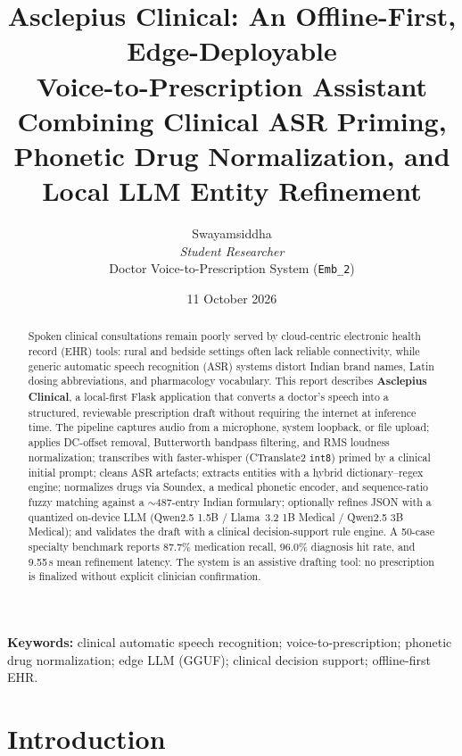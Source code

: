 \documentclass[11pt,a4paper]{article}
\title{\textbf{Asclepius Clinical: An Offline-First, Edge-Deployable\\
Voice-to-Prescription Assistant Combining Clinical ASR Priming,\\
Phonetic Drug Normalization, and Local LLM Entity Refinement}}
\author{Swayamsiddha\\
\textit{Student Researcher}\\
Doctor Voice-to-Prescription System (\texttt{Emb\_2})}
\date{11 October 2026}
\begin{document}
\maketitle

\begin{abstract}
Spoken clinical consultations remain poorly served by cloud-centric electronic health record (EHR) tools: rural and bedside settings often lack reliable connectivity, while generic automatic speech recognition (ASR) systems distort Indian brand names, Latin dosing abbreviations, and pharmacology vocabulary. This report describes \textbf{Asclepius Clinical}, a local-first Flask application that converts a doctor's speech into a structured, reviewable prescription draft without requiring the internet at inference time. The pipeline captures audio from a microphone, system loopback, or file upload; applies DC-offset removal, Butterworth bandpass filtering, and RMS loudness normalization; transcribes with faster-whisper (CTranslate2 \texttt{int8}) primed by a clinical initial prompt; cleans ASR artefacts; extracts entities with a hybrid dictionary--regex engine; normalizes drugs via Soundex, a medical phonetic encoder, and sequence-ratio fuzzy matching against a $\sim$487-entry Indian formulary; optionally refines JSON with a quantized on-device LLM (Qwen2.5 1.5B / Llama~3.2 1B Medical / Qwen2.5 3B Medical); and validates the draft with a clinical decision-support rule engine. A 50-case specialty benchmark reports 87.7\% medication recall, 96.0\% diagnosis hit rate, and 9.55\,s mean refinement latency. The system is an assistive drafting tool: no prescription is finalized without explicit clinician confirmation.
\end{abstract}

\noindent\textbf{Keywords:}
clinical automatic speech recognition;
voice-to-prescription;
phonetic drug normalization;
edge LLM (GGUF);
clinical decision support;
offline-first EHR.

\section{Introduction}
\end{document}
